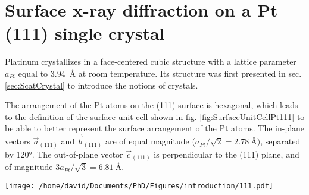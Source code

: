 \section{Surface x-ray diffraction on a Pt (111) single crystal} \label{sec:SXRD111}


Platinum crystallizes in a face-centered cubic structure with a lattice parameter $a_{Pt}$ equal to \qty{3.94}{\angstrom} at room temperature.
Its structure was first presented in sec. \ref{sec:ScatCrystal} to introduce the notions of crystals.

The arrangement of the Pt atoms on the (111) surface is hexagonal, which leads to the definition of the surface unit cell shown in fig. \ref{fig:SurfaceUnitCellPt111} to be able to better represent the surface arrangement of the Pt atoms.
The in-plane vectors $\vec{a}_{(111)}$ and $\vec{b}_{(111)}$ are of equal magnitude ($a_{Pt} / \sqrt{2} = \qty{2.78}{\angstrom})$, separated by \ang{120}.
The out-of-plane vector $\vec{c}_{(111)}$ is perpendicular to the (111) plane, and of magnitude $3 a_{Pt} / \sqrt{3} = \qty{6.81}{\angstrom}$.

\begin{SCfigure}
    \centering
    \texttt{[image: /home/david/Documents/PhD/Figures/introduction/111.pdf]}
    \caption{
        Face-centered cubic unit cell of Pt with (111) crystallographic plane drawn in green.
        $\vec{a}_{(111)}$, $\vec{b}_{(111)}$ and $\vec{c}_{(111)}$ are the (111) surface unit cell vectors.
        There are three (111) planes spanned by the magnitude of $\vec{c}_{(111)}$ (blue, red and green on the figure).
    }
    \label{fig:SurfaceUnitCellPt111}
\end{SCfigure}

